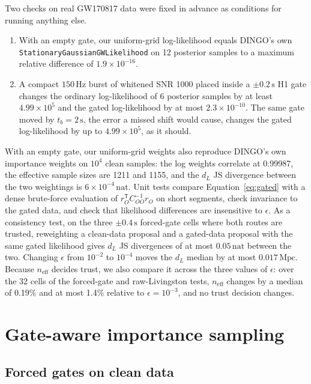 \documentclass{openjournal}
\newcommand{\dL}{d_L}
\newcommand{\neff}{n_{\mathrm{eff}}}
\newcommand{\tp}{^{\mathsf{T}}}
\newcommand{\EPScells}{32}
\newcommand{\EPSmedRelPct}{0.19}
\newcommand{\EPSmaxRelPct}{1.4}
\begin{document}
Two checks on real GW170817 data were fixed in advance as conditions for running anything else.
\begin{enumerate}
\item With an empty gate, our uniform-grid log-likelihood equals DINGO's own \texttt{Stationary\-Gaussian\-GW\-Likelihood} on 12 posterior samples to a maximum relative difference of $1.9\times10^{-16}$.
\item A compact $150\,\mathrm{Hz}$ burst of whitened SNR 1000 placed inside a $\pm0.2\,\mathrm{s}$ H1 gate changes the ordinary log-likelihood of 6 posterior samples by at least $4.99\times10^{5}$ and the gated log-likelihood by at most $2.3\times10^{-10}$.
The same gate moved by $t_b=2\,\mathrm{s}$, the error a missed shift would cause, changes the gated log-likelihood by up to $4.99\times10^{5}$, as it should.
\end{enumerate}
With an empty gate, our uniform-grid weights also reproduce DINGO's own importance weights on $10^{4}$ clean samples: the log weights correlate at 0.99987, the effective sample sizes are 1211 and 1155, and the $\dL$ JS divergence between the two weightings is $6\times10^{-4}\,\mathrm{nat}$.
Unit tests compare Equation~\eqref{eq:gated} with a dense brute-force evaluation of $r_O\tp C_{OO}^{-1} r_O$ on short segments, check invariance to the gated data, and check that likelihood differences are insensitive to $\epsilon$.
As a consistency test, on the three $\pm0.4\,\mathrm{s}$ forced-gate cells where both routes are trusted, reweighting a clean-data proposal and a gated-data proposal with the same gated likelihood gives $\dL$ JS divergences of at most $0.05\,\mathrm{nat}$ between the two.
Changing $\epsilon$ from $10^{-2}$ to $10^{-4}$ moves the $\dL$ median by at most $0.017\,\mathrm{Mpc}$.
Because $\neff$ decides trust, we also compare it across the three values of $\epsilon$: over the \EPScells{} cells of the forced-gate and raw-Livingston tests, $\neff$ changes by a median of \EPSmedRelPct\% and at most \EPSmaxRelPct\% relative to $\epsilon=10^{-3}$, and no trust decision changes.

\section{Gate-aware importance sampling}
\label{sec:results}

\subsection{Forced gates on clean data}
\label{sec:forced}
\end{document}
